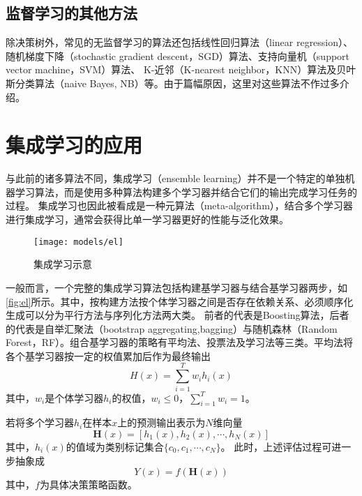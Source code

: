\subsection{监督学习的其他方法}
除决策树外，常见的无监督学习的算法还包括线性回归算法（linear regression）、随机梯度下降（stochastic gradient descent，SGD）算法、支持向量机（support vector machine，SVM）算法、
K-近邻（K-nearest neighbor，KNN）算法及贝叶斯分类算法（naive Bayes, NB）等\cite{Zhou2016,Li2017,Liu2018,Aurélien2018}。由于篇幅原因，这里对这些算法不作过多介绍。

\section{集成学习的应用}
与此前的诸多算法不同，集成学习（ensemble learning）并不是一个特定的单独机器学习算法，而是使用多种算法构建多个学习器并结合它们的输出完成学习任务的过程\cite{Zhou2016,Aurélien2018}。
集成学习也因此被看成是一种元算法（meta-algorithm），结合多个学习器进行集成学习，通常会获得比单一学习器更好的性能与泛化效果。
\begin{figure}[htbp]
    \centering
    \texttt{[image: models/el]}
    \caption[集成学习示意]{\label{fig:el}集成学习示意}
\end{figure}

一般而言，一个完整的集成学习算法包括构建基学习器与结合基学习器两步，如\autoref{fig:el}所示。其中，按构建方法按个体学习器之间是否存在依赖关系、必须顺序化生成可以分为平行方法与序列化方法两大类\cite{Zhou2016}。
前者的代表是Boosting算法，后者的代表是自举汇聚法（bootstrap aggregating,bagging）与随机森林（Random Forest，RF）。组合基学习器的策略有平均法、投票法及学习法等三类。平均法将各个基学习器按一定的权值累加后作为最终输出
\begin{equation}
    \label{equ:average}
    H(x)=\sum_{i=1}^{T}{w_ih_i(x)}
\end{equation}
其中，$w_i$是个体学习器$h_i$的权值，$w_i\le 0$，$\sum_{i=1}^T{w_i}=1$。

若将多个学习器$h_i$在样本$x$上的预测输出表示为$N$维向量
\begin{equation}
    \label{equ:vector_h}
    \boldsymbol H(x) = [h_1(x),h_2(x),\cdots,h_N(x)]
\end{equation}
其中，$h_i(x)$的值域为类别标记集合$\{c_0,c_1,\cdots,c_N\}$。
此时，上述评估过程可进一步抽象成
\begin{equation}
    \label{equ:output_h}
    Y(x) = f(\boldsymbol H(x))
\end{equation}
其中，$f$为具体决策策略函数。


